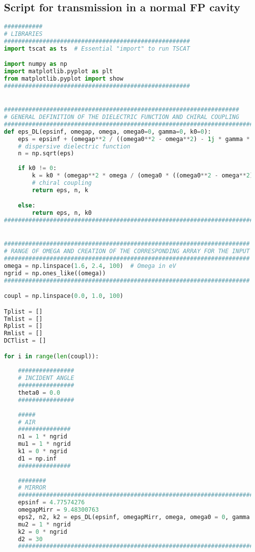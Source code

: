 \documentclass[showpacs,aps,prl,onecolumn,superscriptaddress]{revtex4-1}
\begin{document}
\subsection{Script for transmission in a normal FP cavity}
\begin{lstlisting}[language=Python, caption=Script for Figure 10 $(a)$]
###########
# LIBRARIES
#####################################################
import tscat as ts  # Essential "import" to run TSCAT

import numpy as np
import matplotlib.pyplot as plt
from matplotlib.pyplot import show
#####################################################


###################################################################
# GENERAL DEFINITION OF THE DIELECTRIC FUNCTION AND CHIRAL COUPLING
###############################################################################################
def eps_DL(epsinf, omegap, omega, omega0=0, gamma=0, k0=0):
    eps = epsinf + (omegap**2 / ((omega0**2 - omega**2) - 1j * gamma * omega))  
    # dispersive dielectric function
    n = np.sqrt(eps)
    
    if k0 != 0:
        k = k0 * (omegap**2 * omega / (omega0 * ((omega0**2 - omega**2) - 1j * gamma * omega)))  
        # chiral coupling
        return eps, n, k

    else:
        return eps, n, k0
###############################################################################################


######################################################################
# RANGE OF OMEGA AND CREATION OF THE CORRESPONDING ARRAY FOR THE INPUT
######################################################################
omega = np.linspace(1.6, 2.4, 100)  # Omega in eV
ngrid = np.ones_like((omega))
######################################################################

coupl = np.linspace(0.0, 1.0, 100)

Tplist = []
Tmlist = []
Rplist = []
Rmlist = []
DCTlist = []

for i in range(len(coupl)):
 
    ################
    # INCIDENT ANGLE
    ################
    theta0 = 0.0
    ################
    
    #####
    # AIR
    ###############
    n1 = 1 * ngrid
    mu1 = 1 * ngrid
    k1 = 0 * ngrid
    d1 = np.inf
    ###############
    
    ########
    # MIRROR
    ########################################################################################
    epsinf = 4.77574276
    omegapMirr = 9.48300763
    eps2, n2, k2 = eps_DL(epsinf, omegapMirr, omega, omega0 = 0, gamma = 0.17486845, k0 = 0)
    mu2 = 1 * ngrid
    k2 = 0 * ngrid
    d2 = 30
    ########################################################################################   


\end{lstlisting}
\end{document}
